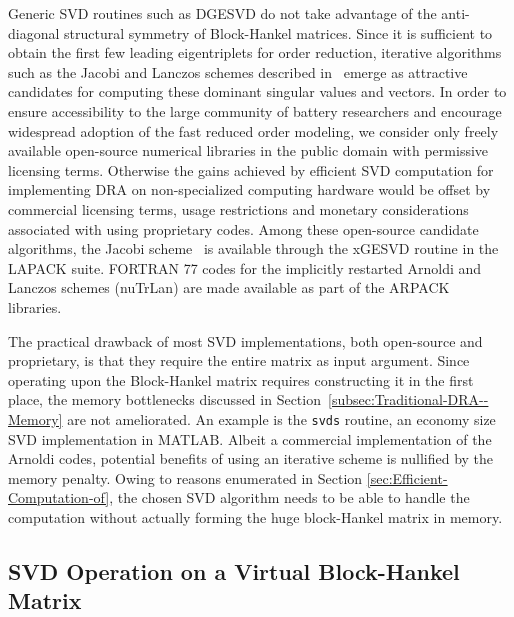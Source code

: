 Generic SVD routines such as DGESVD do not take advantage of the anti-diagonal
structural symmetry of Block-Hankel matrices. Since it is sufficient
to obtain the first few leading eigentriplets for order reduction,
iterative algorithms such as the Jacobi and Lanczos schemes described
in~\citep{GolubVanLoan2012} emerge as attractive candidates for
computing these dominant singular values and vectors. In order to
ensure accessibility to the large community of battery researchers
and encourage widespread adoption of the fast reduced order modeling,
we consider only freely available open-source numerical libraries
in the public domain with permissive licensing terms. Otherwise the
gains achieved by efficient SVD computation for implementing DRA on
non-specialized computing hardware would be offset by commercial licensing
terms, usage restrictions and monetary considerations associated with
using proprietary codes. Among these open-source candidate algorithms,
the Jacobi scheme~\citep{GolubVanLoan2012} is available through
the xGESVD routine in the LAPACK suite. FORTRAN 77 codes for the implicitly
restarted Arnoldi and Lanczos schemes (nuTrLan) are made available
as part of the ARPACK~\citep{LehoucqMaschhoffSorensenEtAl2013} libraries.

The practical drawback of most SVD implementations, both open-source
and proprietary, is that they require the entire matrix as input argument.
Since operating upon the Block-Hankel matrix requires constructing
it in the first place, the memory bottlenecks discussed in Section~\ref{subsec:Traditional-DRA--Memory}
are not ameliorated. An example is the \texttt{svds} routine, an economy
size SVD implementation in MATLAB. Albeit a commercial implementation
of the Arnoldi codes, potential benefits of using an iterative scheme
is nullified by the memory penalty. Owing to reasons enumerated in
Section \ref{sec:Efficient-Computation-of}, the chosen SVD algorithm
needs to be able to handle the computation without actually forming
the huge block-Hankel matrix in memory.

\subsection{SVD Operation on a Virtual Block-Hankel Matrix}

